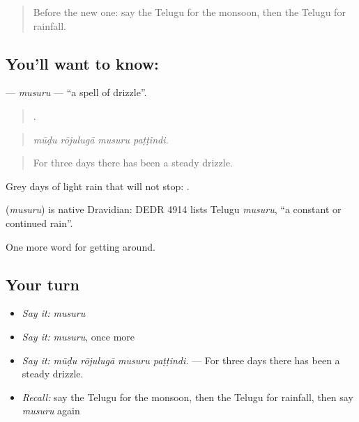 \label{lesson:TE-C477-musuru}



\begin{quote}
Before the new one: say the Telugu for the monsoon, then the Telugu for rainfall.
\end{quote}

\subsection*{You'll want to know: }
\textbf{} — \emph{musuru} — \textquotedblleft{}a spell of drizzle\textquotedblright{}.

\begin{quote}
   .
\end{quote}

\begin{quote}
\emph{mūḍu rōjulugā musuru paṭṭindi.}
\end{quote}

\begin{quote}
For three days there has been a steady drizzle.
\end{quote}

Grey days of light rain that will not stop:  .

\begin{cousinweb}
\textbf{} (\emph{musuru}) is native Dravidian: DEDR 4914 lists Telugu \emph{musuru}, \textquotedblleft{}a constant or continued rain\textquotedblright{}.
\end{cousinweb}

\begin{grammarlens}[title={What you've built}]
One more word for getting around.
\end{grammarlens}

\subsection*{Your turn}
\begin{itemize}
\raggedright
  \item \emph{Say it:} \emph{musuru}
  \item \emph{Say it:} \emph{musuru}, once more
  \item \emph{Say it:} \emph{mūḍu rōjulugā musuru paṭṭindi.} — For three days there has been a steady drizzle.
  \item \emph{Recall:} say the Telugu for the monsoon, then the Telugu for rainfall, then say \emph{musuru} again
\end{itemize}

